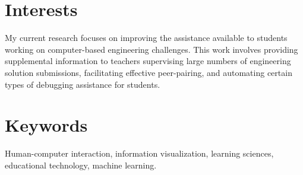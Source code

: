 \documentclass[margin]{res}
\begin{document}
 

 
\address{550 Memorial Dr., Apt. 11B-1\\Cambridge, MA 02139}
\address{ELG@MIT.edu\\
(215) 694-9631} 

 
\begin{resume} 
 
\section{Interests} 
My current research focuses on improving the assistance available to students working on computer-based engineering challenges. This work involves providing supplemental information to teachers supervising large numbers of engineering solution submissions, facilitating effective peer-pairing, and automating certain types of debugging assistance for students.
\section{Keywords} 
Human-computer interaction, information visualization, learning sciences, educational technology, machine learning.


\end{resume}
\end{document}
